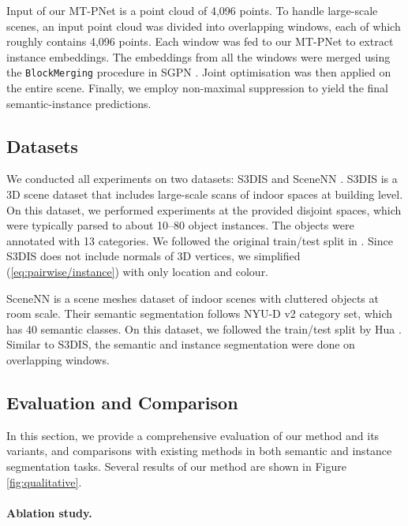 \documentclass[10pt,twocolumn,letterpaper]{article}
\begin{document}
Input of our MT-PNet is a point cloud of 4,096 points. To handle large-scale
scenes, an input point cloud was divided into overlapping windows, each of which
roughly contains 4,096 points. Each window was fed to our MT-PNet to extract
instance embeddings. The embeddings from all the windows were merged using the
\texttt{BlockMerging} procedure in SGPN \cite{wang-sgpn-cvpr18}. Joint
optimisation was then applied on the entire scene. Finally, we employ
non-maximal suppression to yield the final semantic-instance predictions.

\subsection{Datasets}
We conducted all experiments on two datasets: S3DIS \cite{armeni-s3dis-cvpr16}
and SceneNN \cite{hua-scenenn-3dv16}. S3DIS is a 3D scene dataset that includes
large-scale scans of indoor spaces at building level. On this dataset, we
performed experiments at the provided disjoint spaces, which were typically
parsed to about 10--80 object instances. The objects were annotated with 13
categories. We followed the original train/test split in
\cite{armeni-s3dis-cvpr16}. Since S3DIS does not include normals of 3D
vertices, we simplified (\ref{eq:pairwise/instance}) with only location and
colour.

SceneNN \cite{hua-scenenn-3dv16} is a scene meshes dataset of indoor scenes with
cluttered objects at room scale. Their semantic segmentation follows NYU-D v2
\cite{silberman-nyud-eccv12} category set, which has 40 semantic classes. On
this dataset, we followed the train/test split by Hua \etal
\cite{hua-pointwise-cvpr18}. Similar to S3DIS, the semantic and instance
segmentation were done on overlapping windows.

\subsection{Evaluation and Comparison}
In this section, we provide a comprehensive evaluation of our method and its
variants, and comparisons with existing methods in both semantic and instance
segmentation tasks. Several results of our method are shown in Figure
\ref{fig:qualitative}.

\paragraph{Ablation study.}
\end{document}
